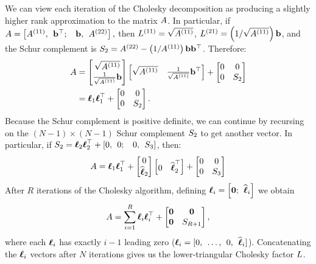 We can view each iteration of the Cholesky decomposition as producing a slightly higher rank approximation to the matrix $A$.
In particular, if  $ A = \left[ A^{(11)}, \:\: \mathbf{b}^{\top}; \:\:\:\: \mathbf{b}, \:\: A^{(22)} \right], $
then $L^{(11)} = \sqrt{A^{(11)}}$, $L^{(21)} = \left( 1 / \sqrt{A^{(11)}} \right) \mathbf{b}$, and the Schur complement is $S_2 = A^{(22)} - \left(1/ A^{(11)} \right) \mathbf{b} \mathbf{b}^{\top}$.
Therefore:
%
\begin{align}
  A &=
    \begin{bmatrix} \sqrt{ A^{(11)} } \\ \frac{1}{\sqrt{A^{(11)}}} \mathbf{b} \end{bmatrix}
    \begin{bmatrix} \sqrt{ A^{(11)} } & \frac{1}{\sqrt{A^{(11)}}} \mathbf{b}^\top \end{bmatrix}
    +
    \begin{bmatrix} 0 & 0 \\ 0 & S_2 \end{bmatrix}
  \nonumber \\
  &= \boldsymbol{\ell}_{1}\boldsymbol{\ell}_{1}^{\top} + \begin{bmatrix} 0 & 0 \\ 0 & S_2 \end{bmatrix}
  \label{eq:chol_incomplete}.
\end{align}
%
Because the Schur complement is positive definite, we can continue by recursing on the $(N-1) \times (N - 1)$ Schur complement $S_2$ to get another vector.
In particular, if $S_2 = \boldsymbol{\ell}_{2}\boldsymbol{\ell}_{2}^{\top} + \left[0, \:\: 0; \:\:\:\: 0, \:\: S_3 \right]$, then:
%
\begin{align*}
  A  = \boldsymbol{\ell}_{1}\boldsymbol{\ell}_{1}^{\top} + \begin{bmatrix} 0 \\ \widehat {\boldsymbol{\ell}}_{2} \end{bmatrix} \begin{bmatrix} 0 & \widehat {\boldsymbol{\ell}}_2^\top \end{bmatrix} +
  \begin{bmatrix} 0 & 0 \\ 0 & S_3 \end{bmatrix}
\end{align*}
%
After $R$ iterations of the Cholesky algorithm, defining $\boldsymbol{\ell}_{i} = \left[ \mathbf{0}; \:\: \widehat {\boldsymbol{\ell}}_i \right]$ we obtain
%
\begin{align}
  A  = \sum_{i=1}^{R} {\boldsymbol{\ell}}_{i} {\boldsymbol{\ell}}_{i}^{\top} + \begin{bmatrix} \mathbf{0} & \mathbf{0} \\ \mathbf{0} & S_{R+1} \end{bmatrix},
  \label{eqn:chol_low_rank}
\end{align}
%
where each $\boldsymbol{\ell}_i$ has exactly $i-1$ leading zero ($\boldsymbol{\ell}_i = [0, \:\: \ldots, \:\: 0, \:\: \widehat {\boldsymbol{\ell}}_i]$).
Concatenating the $\boldsymbol{\ell}_i$ vectors after $N$ iterations gives us the lower-triangular Cholesky factor $L$.

